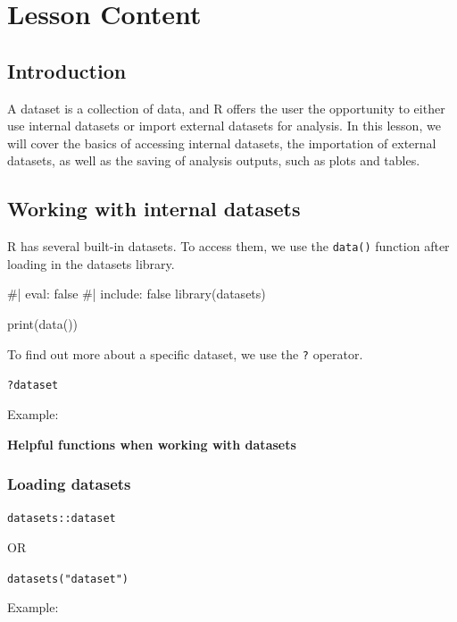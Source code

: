\documentclass[
  letterpaper,
  DIV=11,
  numbers=noendperiod]{scrreprt}
\newenvironment{Shaded}{}{}
\newcommand{\CommentTok}[1]{\textcolor[rgb]{0.42,0.45,0.49}{#1}}
\newcommand{\FunctionTok}[1]{\textcolor[rgb]{0.44,0.26,0.76}{#1}}
\newcommand{\NormalTok}[1]{\textcolor[rgb]{0.14,0.16,0.18}{#1}}
\begin{document}
\section{Lesson Content}\label{lesson-content-4}

\subsection{Introduction}\label{introduction-3}

A dataset is a collection of data, and R offers the user the opportunity
to either use internal datasets or import external datasets for
analysis. In this lesson, we will cover the basics of accessing internal
datasets, the importation of external datasets, as well as the saving of
analysis outputs, such as plots and tables.

\subsection{Working with internal
datasets}\label{working-with-internal-datasets}

R has several built-in datasets. To access them, we use the
\texttt{data()} function after loading in the datasets library.

\begin{Shaded}
\begin{Highlighting}[]
\CommentTok{\#| eval: false}
\CommentTok{\#| include: false}
\FunctionTok{library}\NormalTok{(datasets)}

\FunctionTok{print}\NormalTok{(}\FunctionTok{data}\NormalTok{())}
\end{Highlighting}
\end{Shaded}

To find out more about a specific dataset, we use the \texttt{?}
operator.

\texttt{?dataset}

Example:

\textbf{Helpful functions when working with datasets}

\subsubsection{Loading datasets}\label{loading-datasets}

\texttt{datasets::dataset}

OR

\texttt{datasets("dataset")}

Example:
\end{document}
